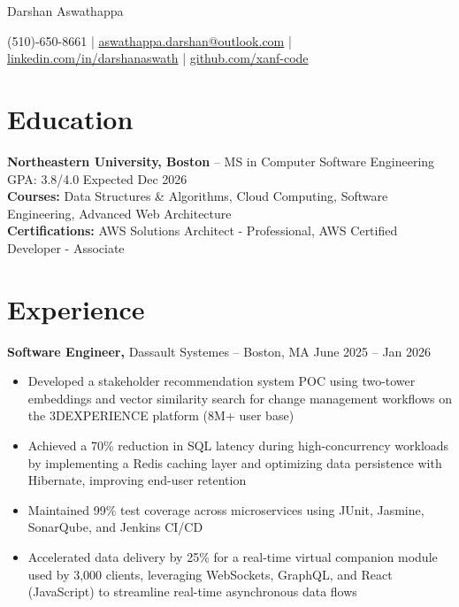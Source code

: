 \documentclass[11pt]{article}       %
\begin{document}
\centerline{\Huge Darshan Aswathappa}

\vspace{5pt}

\centerline{(510)-650-8661 | \href{mailto:aswathappa.darshan@outlook.com}{aswathappa.darshan@outlook.com} | \href{https://www.linkedin.com/in/darshanaswath/}{linkedin.com/in/darshanaswath} | \href{https://github.com/xanf-code}{github.com/xanf-code}}

\vspace{-10pt}

\section*{Education}
\textbf{Northeastern University, Boston} -- MS in Computer Software Engineering \textbar{} GPA: 3.8/4.0 \hfill Expected Dec 2026 \\
\textbf{Courses:} Data Structures \& Algorithms, Cloud Computing, Software Engineering, Advanced Web Architecture \\
\textbf{Certifications:} AWS Solutions Architect - Professional, AWS Certified Developer - Associate
\vspace{-6.5pt}

\section*{Experience}

\textbf{Software Engineer,} {Dassault Systemes} -- Boston, MA \hfill June 2025 -- Jan 2026 \\
\vspace{-9pt}
\begin{itemize}
    \item Developed a stakeholder recommendation system POC using two-tower embeddings and vector similarity search for change management workflows on the 3DEXPERIENCE platform (8M+ user base)
    \item Achieved a 70\% reduction in SQL latency during high-concurrency workloads by implementing a Redis caching layer and optimizing data persistence with Hibernate, improving end-user retention
    \item Maintained 99\% test coverage across microservices using JUnit, Jasmine, SonarQube, and Jenkins CI/CD
    \item Accelerated data delivery by 25\% for a real-time virtual companion module used by 3,000 clients, leveraging WebSockets, GraphQL, and React (JavaScript) to streamline real-time asynchronous data flows
\end{itemize}
\end{document}
